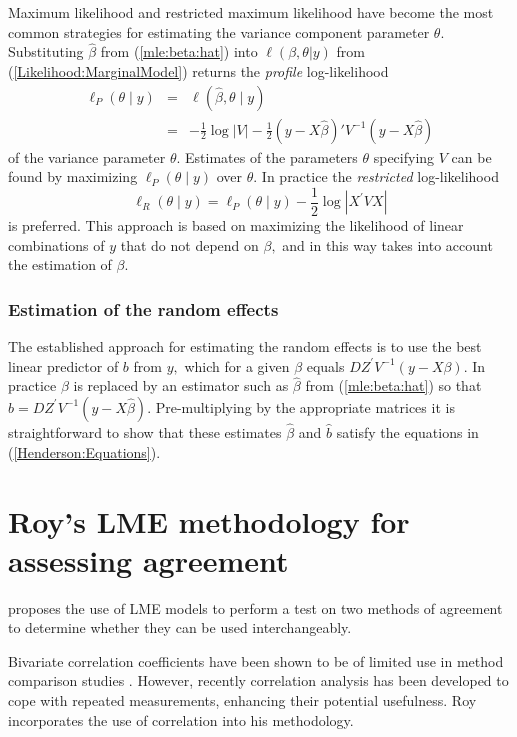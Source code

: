 \documentclass[12pt, a4paper]{report}
\theoremstyle{plain}
\theoremstyle{definition}
\theoremstyle{remark}
\begin{document}
Maximum likelihood and restricted maximum likelihood have become the most common strategies for estimating the variance component parameter $\theta.$ Substituting $\hat{\beta}$ from (\ref{mle:beta:hat}) into $\ell(\beta, \theta|y)$ from (\ref{Likelihood:MarginalModel}) returns the \emph{profile} log-likelihood
\begin{eqnarray*}
	\ell_P(\theta \mid y) &=& \ell(\hat{\beta}, \theta \mid y) \\ 
	&=& -\frac{1}{2} \log |V| -\frac{1}{2}(y - X \hat{\beta})'V^{-1}(y - X \hat{\beta})
\end{eqnarray*}
of the variance parameter $\theta.$ Estimates of the parameters $\theta$ specifying $V$ can be found by maximizing $\ell_P(\theta \mid y)$ over $\theta.$ In practice the \emph{restricted} log-likelihood
\[
\ell_R(\theta \mid y) =
\ell_P(\theta \mid y) -\frac{1}{2} \log |X^\prime VX |
\]
is preferred. This approach is based on maximizing the likelihood of linear combinations of $y$ that do not depend on $\beta,$ and in this way takes into account the estimation of $\beta.$


\subsubsection*{Estimation of the random effects}

The established approach for estimating the random effects is to use the best linear predictor of $b$ from $y,$ which for a given $\beta$ equals $DZ^\prime V^{-1}(y - X \beta).$ In practice $\beta$ is replaced by an estimator such as $\hat{\beta}$ from (\ref{mle:beta:hat}) so that $\hat{b} = DZ^\prime V^{-1}(y - X \hat{\beta}).$ Pre-multiplying by the appropriate matrices it is straightforward to show that these estimates $\hat{\beta}$ and $\hat{b}$ satisfy the equations in (\ref{Henderson:Equations}).




\section{Roy's LME methodology for assessing agreement}

\citet{ARoy2009} proposes the use of LME models to perform a test
on two methods of agreement to determine whether they can be used
interchangeably.

Bivariate correlation coefficients have been shown to be of
limited use in method comparison studies \citep{BA86}. However,
recently correlation analysis has been developed to cope with
repeated measurements, enhancing their potential usefulness. Roy
incorporates the use of correlation into his methodology.
\end{document}
